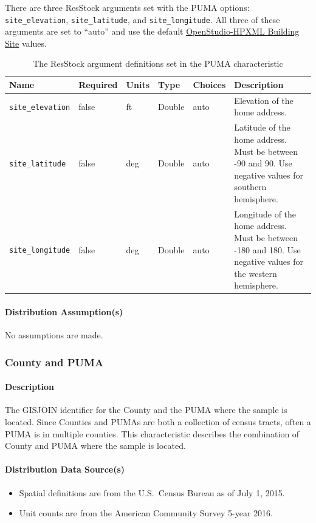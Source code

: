There are three ResStock arguments set with the PUMA options: \texttt{site\_elevation}, \texttt{site\_latitude}, and \texttt{site\_longitude}. All three of these arguments are set to ``auto'' and use the default \href{https://openstudio-hpxml.readthedocs.io/en/v1.8.1/workflow_inputs.html#hpxml-building-site}{OpenStudio-HPXML Building Site} values.

\begin{longtable}[]{ |p{}|p{1.5cm}|p{1cm}|p{1.1cm}|p{1.4cm}|p{6cm}| }
\caption{The ResStock argument definitions set in the PUMA characteristic} \label{table:hc_arg_def_puma}  \\
\toprule\noalign{}
Name & Required & Units & Type & Choices & Description \\
\midrule\noalign{}
\endhead
\bottomrule\noalign{}
\endlastfoot
\texttt{site\_elevation} & false & ft & Double & auto & Elevation of the
home address.  \\
\hline
\texttt{site\_latitude} & false & deg & Double & auto & Latitude of the
home address. Must be between -90 and 90. Use negative values for
southern hemisphere.\\
\hline
\texttt{site\_longitude} & false & deg & Double & auto & Longitude of
the home address. Must be between -180 and 180. Use negative values for
the western hemisphere.\\
\end{longtable}

\paragraph{Distribution Assumption(s)}
No assumptions are made.

\subsubsection{County and PUMA}
\paragraph{Description}
The GISJOIN identifier for the County and the PUMA where the sample is located. Since Counties and PUMAs are both a collection of census tracts, often a PUMA is in multiple counties. This characteristic describes the combination of County and PUMA where the sample is located.

\paragraph{Distribution Data Source(s)}
\begin{itemize}
 
\item
  Spatial definitions are from the U.S.~Census Bureau as of July 1,
  2015.
\item
  Unit counts are from the American Community Survey 5-year 2016.
\end{itemize}

